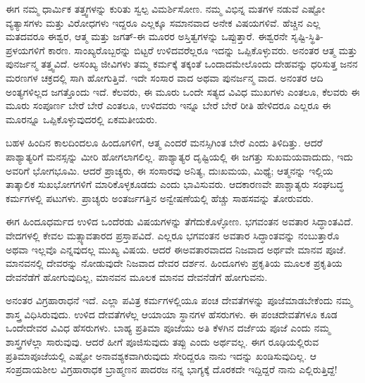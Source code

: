 \vskip 2pt

ಈಗ ನಮ್ಮ ಧಾರ್ಮಿಕ ತತ್ತ್ವಗಳನ್ನು ಕುರಿತು ಸ್ವಲ್ಪ ವಿಮರ್ಶಿಸೋಣ. ನಮ್ಮ ವಿಭಿನ್ನ ಮತಗಳ ನಡುವೆ ಎಷ್ಟೋ ವ್ಯತ್ಯಾಸಗಳು ಮತ್ತು ವಿರೋಧಗಳು ಇದ್ದರೂ ಎಲ್ಲಕ್ಕೂ ಸಮಾನವಾದ ಅನೇಕ ವಿಷಯಗಳಿವೆ. ಹೆಚ್ಚಿನ ಎಲ್ಲ ಮತದವರೂ ಈಶ್ವರ, ಆತ್ಮ ಮತ್ತು ಜಗತ್​-ಈ ಮೂರರ ಅಸ್ತಿತ್ವಗಳನ್ನು ಒಪ್ಪುತ್ತಾರೆ. ಈಶ್ವರನೇ ಸೃಷ್ಟಿ-ಸ್ಥಿತಿ-ಪ್ರಳಯಗಳಿಗೆ ಕಾರಣ. ಸಾಂಖ್ಯರೊಬ್ಬರನ್ನು ಬಿಟ್ಟರೆ ಉಳಿದವರೆಲ್ಲರೂ ಇದನ್ನು ಒಪ್ಪಿಕೊಳ್ಳುವರು. ಅನಂತರ ಆತ್ಮ ಮತ್ತು ಪುನರ್ಜನ್ಮ ತತ್ತ್ವವಿದೆ. ಅಸಂಖ್ಯ ಜೀವಿಗಳು ತಮ್ಮ ಕರ್ಮಕ್ಕೆ ತಕ್ಕಂತೆ ಒಂದಾದಮೇಲೊಂದು ದೇಹವನ್ನು ಧರಿಸುತ್ತ ಜನನ ಮರಣಗಳ ಚಕ್ರದಲ್ಲಿ ಸಾಗಿ ಹೋಗುತ್ತಿವೆ. ಇದೇ ಸಂಸಾರ ವಾದ ಅಥವಾ ಪುನರ್ಜನ್ಮ ವಾದ. ಅನಂತರ ಆದಿ ಅಂತ್ಯಗಳಿಲ್ಲದ ಜಗತ್ತೊಂದು ಇದೆ. ಕೆಲವರು, ಈ ಮೂರು ಒಂದೇ ಸತ್ಯದ ವಿವಿಧ ಮುಖಗಳು ಎಂತಲೂ, ಕೆಲವರು ಈ ಮೂರು ಸಂಪೂರ್ಣ ಬೇರೆ ಬೇರೆ ಎಂತಲೂ, ಉಳಿದವರು ಇನ್ನೂ ಬೇರೆ ಬೇರೆ ರೀತಿ ಹೇಳಿದರೂ ಎಲ್ಲರೂ ಈ ಮೂರನ್ನೂ ಒಪ್ಪಿಕೊಳ್ಳುವುದರಲ್ಲಿ ಏಕಮತೀಯರು.

\vskip 2pt

ಬಹಳ ಹಿಂದಿನ ಕಾಲದಿಂದಲೂ ಹಿಂದೂಗಳಿಗೆ, ಆತ್ಮ ಎಂದರೆ ಮನಸ್ಸಿಗಿಂತ ಬೇರೆ ಎಂದು ತಿಳಿದಿತ್ತು. ಆದರೆ ಪಾಶ್ಯಾತ್ಯರಿಗೆ ಮನಸ್ಸನ್ನು ಮೀರಿ ಹೋಗ\-ಲಾಗಲಿಲ್ಲ. ಪಾಶ್ಯಾತ್ಯರ ದೃಷ್ಟಿಯಲ್ಲಿ ಈ ಜಗತ್ತು ಸುಖಮಯವಾದುದು, ಇದು ಅವರಿಗೆ ಭೋಗಭೂಮಿ. ಆದರೆ ಪ್ರಾಚ್ಯರು, ಈ ಸಂಸಾರವು ಅನಿತ್ಯ, ದುಃಖಮಯ, ಮಿಥ್ಯೆ; ಆತ್ಮನನ್ನು ಇಲ್ಲಿಯ ತಾತ್ಕಾಲಿಕ ಸುಖಭೋಗಗಳಿಗೆ ಮಾರಿಕೊಳ್ಳಕೂಡದು ಎಂದು ಭಾವಿಸುವರು. ಆದಕಾರಣವೇ ಪಾಶ್ಚಾತ್ಯರು ಸಂಘಬದ್ಧ ಕರ್ಮಗಳಲ್ಲಿ ಪಟುಗಳು. ಪ್ರಾಚ್ಯರು ಅಂತರ್ಜಗತ್ತಿನ ಅನ್ವೇಷಣೆಯಲ್ಲಿ ಹೆಚ್ಚು ಸಾಹಸವನ್ನು ತೋರುವರು.

ಈಗ ಹಿಂದೂಧರ್ಮದ ಉಳಿದ ಒಂದೆರಡು ವಿಷಯಗಳನ್ನು ತೆಗೆದು\-ಕೊಳ್ಳೋಣ. ಭಗವಂತನ ಅವತಾರ ಸಿದ್ಧಾಂತವಿದೆ. ವೇದಗಳಲ್ಲಿ ಕೇವಲ ಮತ್ಸ್ಯಾವತಾರದ ಪ್ರಸ್ತಾಪವಿದೆ. ಎಲ್ಲರೂ ಭಗವಂತನ ಅವತಾರ ಸಿದ್ಧಾಂತವನ್ನು ನಂಬುತ್ತಾರೊ ಅಥವಾ ಇಲ್ಲವೊ ಎನ್ನವುದಲ್ಲ ಮುಖ್ಯ ವಿಷಯ. ಆದರೆ ಈ\break ಅವತಾರವಾದದ ನಿಜವಾದ ಅರ್ಥವೇ ಮಾನವ ಪೂಜೆ. ಮಾನವನಲ್ಲಿ ದೇವರನ್ನು ನೋಡುವುದೇ ನಿಜವಾದ ದೇವರ ದರ್ಶನ. ಹಿಂದೂಗಳು ಪ್ರಕೃತಿಯ ಮೂಲಕ ಪ್ರಕೃತಿಯ ದೇವನೆಡೆಗೆ ಹೋಗುವುದಿಲ್ಲ, ಮಾನವನ ಮೂಲಕ ಮಾನವ ದೇವನೆಡೆಗೆ ಹೋಗುವನು.

ಅನಂತರ ವಿಗ್ರಹಾರಾಧನೆ ಇದೆ. ಎಲ್ಲಾ ಪವಿತ್ರ ಕರ್ಮಗಳಲ್ಲಿಯೂ ಪಂಚ ದೇವತೆಗಳನ್ನು ಪೂಜೆಮಾಡಬೇಕೆಂದು ನಮ್ಮ ಶಾಸ್ತ್ರ ವಿಧಿಸಿರುವುದು. ಉಳಿದ ದೇವತೆಗಳೆಲ್ಲ ಆಯಾಯಾ ಸ್ಥಾನಗಳ ಹೆಸರುಗಳು. ಈ ಪಂಚದೇವತೆಗಳೂ ಕೂಡ ಒಂದೇದೇವರ ವಿವಿಧ ಹೆಸರುಗಳು. ಬಾಹ್ಯ ಪ್ರತಿಮಾ ಪೂಜೆಯು ಅತಿ ಕೆಳಗಿನ ದರ್ಜೆಯ ಪೂಜೆ ಎಂದು ನಮ್ಮ ಶಾಸ್ತ್ರಗಳೆಲ್ಲಾ ಸಾರುವುವು. ಆದರೆ ಹೀಗೆ ಪೂಜಿಸುವುದು ತಪ್ಪು ಎಂದು ಅರ್ಥವಲ್ಲ. ಈಗ ರೂಢಿಯಲ್ಲಿರುವ ಪ್ರತಿಮಾಪೂಜೆಯಲ್ಲಿ ಎಷ್ಟೋ ಅನಾವಶ್ಯಕವಾಗಿರುವುದು ಸೇರಿದ್ದರೂ ನಾನು ಇದನ್ನು ಖಂಡಿಸುವುದಿಲ್ಲ. ಆ ಸಂಪ್ರದಾಯಶೀಲ ವಿಗ್ರಹಾರಾಧಕ ಬ್ರಾಹ್ಮಣನ ಪಾದರಜ ನನ್ನ ಭಾಗ್ಯಕ್ಕೆ ದೊರಕದೇ ಇದ್ದಿದ್ದರೆ ನಾನು ಎಲ್ಲಿರುತ್ತಿದ್ದೆ!

